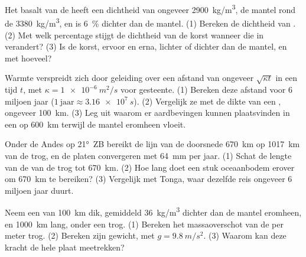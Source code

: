 \begin{exercise}[$\star\star$]\label{exo:g11:subduction-zones:11}
Het basalt van de  heeft een dichtheid van ongeveer \qty{2900}{kg/m^3},
de mantel rond de  \qty{3380}{kg/m^3}, en  is
\qty{6}{\percent} dichter dan de mantel. (1) Bereken de dichtheid van .
(2) Met welk percentage stijgt de dichtheid van de korst wanneer die in
 verandert? (3) Is de korst, ervoor en erna, lichter of dichter dan de
mantel, en met hoeveel?
\end{exercise}

\begin{exercise}[$\star\star\star$]\label{exo:g11:subduction-zones:12}
Warmte verspreidt zich door geleiding over een afstand van ongeveer $\sqrt{\kappa t}$ in een
tijd $t$, met $\kappa = \qty{1e-6}{m^2/s}$ voor gesteente. (1) Bereken deze afstand
voor 6 miljoen jaar ($1~\text{jaar} \approx \qty{3.16e7}{s}$). (2) Vergelijk ze
met de dikte van een , ongeveer \qty{100}{km}. (3) Leg uit waarom er
aardbevingen kunnen plaatsvinden in een  op \qty{600}{km} terwijl de mantel eromheen
vloeit.
\end{exercise}

\begin{exercise}[$\star\star\star$]\label{exo:g11:subduction-zones:13}
Onder de Andes op \ang{21}~ZB bereikt de lijn van de doorsnede
\qty{670}{km} op \qty{1017}{km} van de trog, en de platen convergeren met
\qty{64}{mm} per jaar. (1) Schat de lengte van de  van de trog tot
\qty{670}{km}. (2) Hoe lang doet een stuk oceaanbodem erover om
\qty{670}{km} te bereiken? (3) Vergelijk met Tonga, waar dezelfde reis ongeveer 6
miljoen jaar duurt.
\end{exercise}

\begin{exercise}[$\star\star\star$]\label{exo:g11:subduction-zones:14}
Neem een  van \qty{100}{km} dik, gemiddeld \qty{36}{kg/m^3} dichter dan de
mantel eromheen, en \qty{1000}{km} lang, onder een trog.
(1) Bereken het massaoverschot van de  per meter trog. (2) Bereken
zijn gewicht, met $g = \qty{9.8}{m/s^2}$. (3) Waarom kan deze kracht de hele
plaat meetrekken?
\end{exercise}

